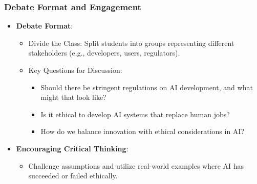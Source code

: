 \documentclass{beamer}
\begin{document}
\begin{frame}[fragile]
    \frametitle{Debate Format and Engagement}
    \begin{itemize}
        \item \textbf{Debate Format}:
        \begin{itemize}
            \item Divide the Class: Split students into groups representing different stakeholders (e.g., developers, users, regulators).
            \item Key Questions for Discussion:
            \begin{itemize}
                \item Should there be stringent regulations on AI development, and what might that look like?
                \item Is it ethical to develop AI systems that replace human jobs?
                \item How do we balance innovation with ethical considerations in AI?
            \end{itemize}
        \end{itemize}
        
        \item \textbf{Encouraging Critical Thinking}:
        \begin{itemize}
            \item Challenge assumptions and utilize real-world examples where AI has succeeded or failed ethically.
        \end{itemize}
    \end{itemize}
\end{frame}
\end{document}
